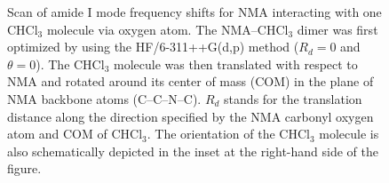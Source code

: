 \documentclass[a4paper,titlepage,twoside,fleqn,12pt]{book}
\begin{document}
\begin{refsection}
{\begin{figure}[t!]
{}
\caption{
Scan of amide I mode frequency shifts for NMA interacting 
with one CHCl$_3$ molecule via oxygen atom.
The NMA--CHCl$_3$ dimer was first optimized
by using the HF/6-311++G(d,p) method 
($R_d = 0$ and $\theta = 0$). 
The CHCl$_3$ molecule was then translated with respect to 
NMA and rotated around its center of mass (COM) in the plane 
of NMA backbone atoms (C--C--N--C). $R_d$ stands for the translation 
distance along the direction specified by the NMA
carbonyl oxygen atom and COM of CHCl$_3$. The orientation of the CHCl$_3$
molecule is also schematically depicted in the inset at the 
right\hyp{}hand side of the figure.
\label{f:nma-orient-d}}
\end{figure}
\clearpage
}
%
\end{refsection}
\end{document}
